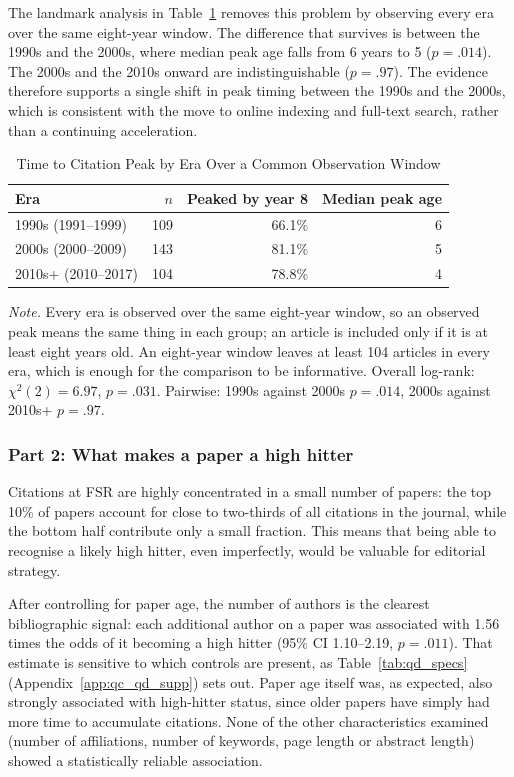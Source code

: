 \documentclass[11pt,a4paper]{article}
\newcommand{\tablenote}[1]{\par\smallskip\parbox{\linewidth}{\footnotesize\textit{Note.} #1}}
\begin{document}
The landmark analysis in Table~\ref{tab:qd_landmark} removes this problem by observing every era over the same eight-year window. The difference that survives is between the 1990s and the 2000s, where median peak age falls from 6 years to 5 ($p = .014$). The 2000s and the 2010s onward are indistinguishable ($p = .97$). The evidence therefore supports a single shift in peak timing between the 1990s and the 2000s, which is consistent with the move to online indexing and full-text search, rather than a continuing acceleration.

\begin{table}[htbp]
\centering
\small
\caption{Time to Citation Peak by Era Over a Common Observation Window}
\label{tab:qd_landmark}
\begin{tabular}{lrrr}
\toprule
Era & $n$ & Peaked by year 8 & Median peak age \\
\midrule
1990s (1991--1999) & 109 & 66.1\% & 6 \\
2000s (2000--2009) & 143 & 81.1\% & 5 \\
2010s+ (2010--2017) & 104 & 78.8\% & 4 \\
\bottomrule
\end{tabular}
\tablenote{Every era is observed over the same eight-year window, so an observed peak means the same thing in each group; an article is included only if it is at least eight years old. An eight-year window leaves at least 104 articles in every era, which is enough for the comparison to be informative. Overall log-rank: $\chi^2(2) = 6.97$, $p = .031$. Pairwise: 1990s against 2000s $p = .014$, 2000s against 2010s+ $p = .97$.}
\end{table}

\subsubsection{Part 2: What makes a paper a high hitter}\label{part-2-what-makes-a-paper-a-high-hitter}

Citations at FSR are highly concentrated in a small number of papers: the top 10\% of papers account for close to two-thirds of all citations in the journal, while the bottom half contribute only a small fraction. This means that being able to recognise a likely high hitter, even imperfectly, would be valuable for editorial strategy.

After controlling for paper age, the number of authors is the clearest bibliographic signal: each additional author on a paper was associated with 1.56 times the odds of it becoming a high hitter (95\% CI 1.10--2.19, $p = .011$). That estimate is sensitive to which controls are present, as Table~\ref{tab:qd_specs} (Appendix~\ref{app:qc_qd_supp}) sets out. Paper age itself was, as expected, also strongly associated with high-hitter status, since older papers have simply had more time to accumulate citations. None of the other characteristics examined (number of affiliations, number of keywords, page length or abstract length) showed a statistically reliable association.
\end{document}
